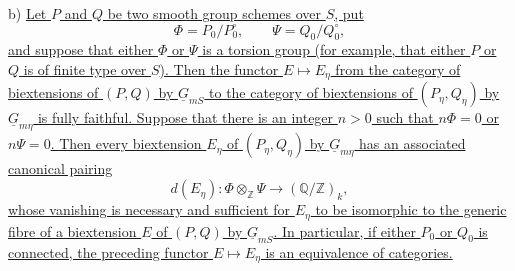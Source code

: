 \smallskip
\noindent b) \underline{Let $P$ and $Q$ be two smooth group schemes over
$S$, put}
\[
 \Phi=P_0/P_0^{\circ},\qquad \Psi=Q_0/Q_0^{\circ},
\]
\underline{and suppose that either $\Phi$ or $\Psi$ is a torsion group (for
example, that either $P$ or $Q$ is of finite type over $S$).  Then the
functor $E\mapsto E_\eta$ from the category of biextensions of $(P,Q)$ by
$\underline G_{mS}$ to the category of biextensions of
$(P_\eta,Q_\eta)$ by $\underline G_{m\eta}$ is fully faithful.  Suppose that
there is an integer $n>0$ such that $n\Phi=0$ or $n\Psi=0$.  Then every
biextension $E_\eta$ of $(P_\eta,Q_\eta)$ by $\underline G_{m\eta}$ has an
associated canonical pairing}
\begin{equation}\tag{7.1.2}
 d(E_\eta):\Phi\otimes_{\mathbb Z}\Psi
 \longrightarrow(\mathbb Q/\mathbb Z)_k,
\end{equation}
\underline{whose vanishing is necessary and sufficient for $E_\eta$ to be
isomorphic to the generic fibre of a biextension $E$ of $(P,Q)$ by
$\underline G_{mS}$.  In particular, if either $P_0$ or $Q_0$ is connected,
the preceding functor $E\mapsto E_\eta$ is an equivalence of categories.}

